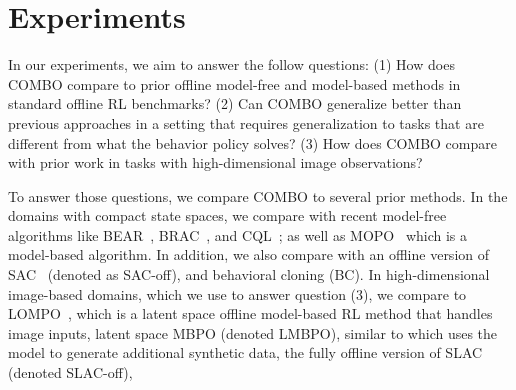 \section{Experiments}
\label{sec:exp}

In our experiments, we aim to answer the follow questions: (1) How does COMBO compare to prior offline model-free and model-based methods in standard offline RL benchmarks? (2) Can COMBO generalize better than previous approaches in a setting that requires generalization to tasks that are different from what the behavior policy solves?
(3) How does COMBO compare with prior work in tasks with high-dimensional image observations?

To answer those questions, we compare COMBO to several prior methods. In the domains with compact state spaces, we compare with recent model-free algorithms like BEAR~\citep{kumar2019stabilizing}, BRAC~\citep{wu2019behavior}, and CQL~\citep{kumar2020conservative}; as well as MOPO~\citep{yu2020mopo} which is a model-based algorithm. In addition, we also compare with an offline version of SAC~\citep{haarnoja2018soft} (denoted as SAC-off), and behavioral cloning (BC).
In high-dimensional image-based domains, which we use to answer question (3), we compare to LOMPO~\citep{Rafailov2020LOMPO}, which is a latent space offline model-based RL method that handles image inputs, latent space MBPO (denoted LMBPO), similar to \citet{janner2019trust} which uses the model to generate additional synthetic data, the fully offline version of SLAC \citep{lee2019SLAC} (denoted SLAC-off),
